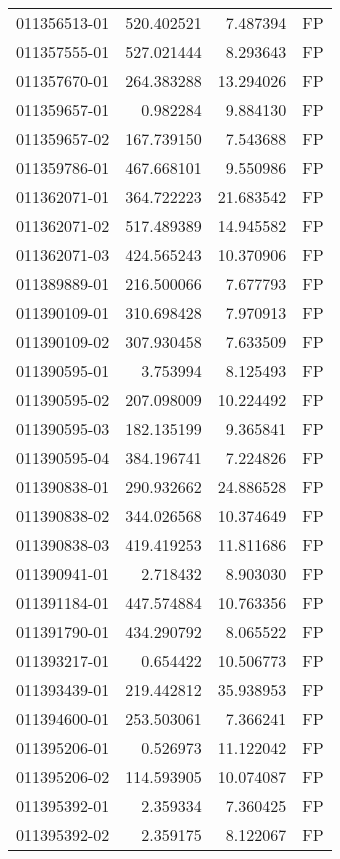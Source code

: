 \begin{tabular}{lrrl}
011356513-01 &  520.402521 &     7.487394 &   FP \\
011357555-01 &  527.021444 &     8.293643 &   FP \\
011357670-01 &  264.383288 &    13.294026 &   FP \\
011359657-01 &    0.982284 &     9.884130 &   FP \\
011359657-02 &  167.739150 &     7.543688 &   FP \\
011359786-01 &  467.668101 &     9.550986 &   FP \\
011362071-01 &  364.722223 &    21.683542 &   FP \\
011362071-02 &  517.489389 &    14.945582 &   FP \\
011362071-03 &  424.565243 &    10.370906 &   FP \\
011389889-01 &  216.500066 &     7.677793 &   FP \\
011390109-01 &  310.698428 &     7.970913 &   FP \\
011390109-02 &  307.930458 &     7.633509 &   FP \\
011390595-01 &    3.753994 &     8.125493 &   FP \\
011390595-02 &  207.098009 &    10.224492 &   FP \\
011390595-03 &  182.135199 &     9.365841 &   FP \\
011390595-04 &  384.196741 &     7.224826 &   FP \\
011390838-01 &  290.932662 &    24.886528 &   FP \\
011390838-02 &  344.026568 &    10.374649 &   FP \\
011390838-03 &  419.419253 &    11.811686 &   FP \\
011390941-01 &    2.718432 &     8.903030 &   FP \\
011391184-01 &  447.574884 &    10.763356 &   FP \\
011391790-01 &  434.290792 &     8.065522 &   FP \\
011393217-01 &    0.654422 &    10.506773 &   FP \\
011393439-01 &  219.442812 &    35.938953 &   FP \\
011394600-01 &  253.503061 &     7.366241 &   FP \\
011395206-01 &    0.526973 &    11.122042 &   FP \\
011395206-02 &  114.593905 &    10.074087 &   FP \\
011395392-01 &    2.359334 &     7.360425 &   FP \\
011395392-02 &    2.359175 &     8.122067 &   FP \\

\end{tabular}
